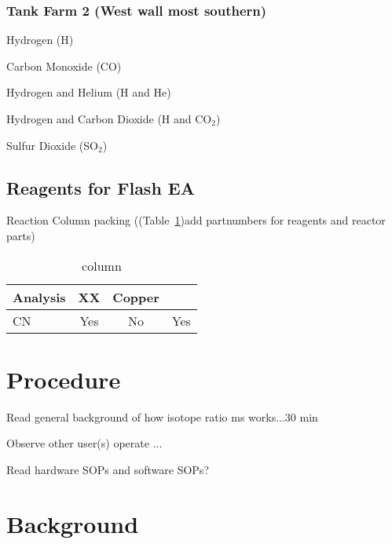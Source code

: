 \documentclass[12pt]{../SOP3_beta}\usepackage[]{graphicx}\usepackage[]{color}
\begin{document}
\subsubsection{Tank Farm 2 (West wall most southern)}

\NP Hydrogen (H)

\NP Carbon Monoxide (CO)

\NP Hydrogen and Helium (H and He)

\NP Hydrogen and Carbon Dioxide (H and CO$_2$)

\NP Sulfur Dioxide (SO$_2$)

\subsection{Reagents for Flash EA}

\NP Reaction Column packing ((Table~\ref{column})add partnumbers for reagents and reactor parts)

\begin{table}[h]
\label{column}
\caption{column}
\centering
\begin{tabular}{lccc} \hline
Analysis      & XX    & Copper  & \\ \hline\hline
CN            & Yes   & No      & Yes \\ \hline


\end{tabular}
\end{table}




\section{Procedure}

\NP Read general background of how isotope ratio ms works...30 min

\NP Observe other user(s) operate ...

\NP Read hardware SOPs and software SOPs?

\section{Background}
\end{document}
